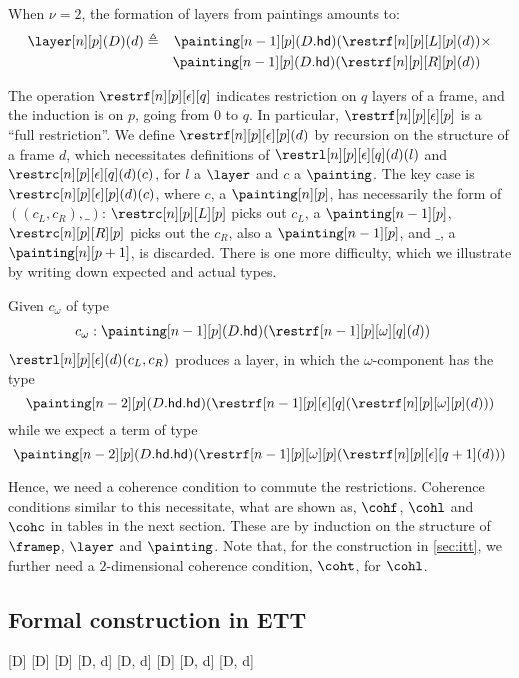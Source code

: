 \documentclass[10pt]{art.cls/art}
\newcommand{\defeq}{\ensuremath{\triangleq}}
\newcommand{\hd}{\ensuremath{\mathsf{hd}}}
\begin{document}
When $\nu = 2$, the formation of layers from paintings amounts to:
\begin{align*}
  \layer[n][p](D)(d) & \defeq & \painting[n-1][p](D.\hd)(\restrf[n][p][L][p](d)) & \times \\
                     &        & \painting[n-1][p](D.\hd)(\restrf[n][p][R][p](d)) &
\end{align*}

The operation $\restrf[n][p][\epsilon][q]$ indicates restriction on $q$ layers of a frame, and the induction is on $p$, going from $0$ to $q$. In particular, $\restrf[n][p][\epsilon][p]$ is a ``full restriction''. We define $\restrf[n][p][\epsilon][p](d)$ by recursion on the structure of a frame $d$, which necessitates definitions of $\restrl[n][p][\epsilon][q](d)(l)$ and $\restrc[n][p][\epsilon][q](d)(c)$, for $l$ a $\layer$ and $c$ a $\painting$. The key case is $\restrc[n][p][\epsilon][p](d)(c)$, where $c$, a $\painting[n][p]$, has necessarily the form of $((c_L, c_R), \_)$: $\restrc[n][p][L][p]$ picks out $c_L$, a $\painting[n-1][p]$, $\restrc[n][p][R][p]$ picks out the $c_R$, also a $\painting[n-1][p]$, and $\_$, a $\painting[n][p+1]$, is discarded. There is one more difficulty, which we illustrate by writing down expected and actual types.

Given $c_\omega$ of type
\begin{align*}
  c_\omega & : \painting[n-1][p](D.\hd)(\restrf[n-1][p][\omega][q](d))
\end{align*}
$\restrl[n][p][\epsilon](d)(c_L, c_R)$ produces a layer, in which the $\omega$-component has the type
\begin{equation*}
  \painting[n-2][p](D.\hd.\hd)(\restrf[n-1][p][\epsilon][q](\restrf[n][p][\omega][p](d)))
\end{equation*}
while we expect a term of type
\begin{equation*}
  \painting[n-2][p](D.\hd.\hd)(\restrf[n-1][p][\omega][p](\restrf[n][p][\epsilon][q+1](d)))
\end{equation*}

Hence, we need a coherence condition to commute the restrictions. Coherence conditions similar to this necessitate, what are shown as, $\cohf$, $\cohl$ and $\cohc$ in tables in the next section. These are by induction on the structure of $\framep$, $\layer$ and $\painting$. Note that, for the construction in \ref{sec:itt}, we further need a $2$-dimensional coherence condition, $\coht$, for $\cohl$.

\subsection{Formal construction in ETT}
%
[D]
[D]
[D]
[D, d]
[D, d]
[D]
[D, d]
[D, d]
\end{document}
